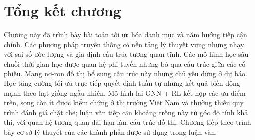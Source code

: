 \section{Tổng kết chương}

Chương này đã trình bày bài toán tối ưu hóa danh mục và năm hướng tiếp cận chính. Các phương pháp truyền thống có nền tảng lý thuyết vững nhưng nhạy với sai số ước lượng và giả định cấu trúc tương quan tĩnh. Các mô hình học sâu chuỗi thời gian học được quan hệ phi tuyến nhưng bỏ qua cấu trúc giữa các cổ phiếu. Mạng nơ-ron đồ thị bổ sung cấu trúc này nhưng chủ yếu dừng ở dự báo. Học tăng cường tối ưu trực tiếp quyết định tuần tự nhưng kết quả biến động mạnh theo hạt giống ngẫu nhiên. Mô hình lai GNN + RL kết hợp các ưu điểm trên, song còn ít được kiểm chứng ở thị trường Việt Nam và thường thiếu quy trình đánh giá chặt chẽ; luận văn tiếp cận khoảng trống này từ góc độ tính khả thi, với quan hệ tương quan dài hạn làm cấu trúc đồ thị. Chương tiếp theo trình bày cơ sở lý thuyết của các thành phần được sử dụng trong luận văn.
